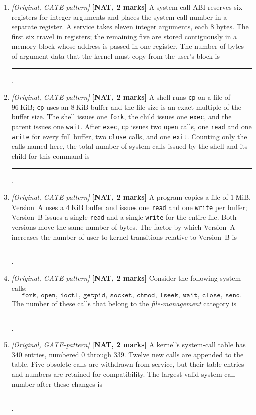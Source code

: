 \documentclass[11pt]{article}
\begin{document}
\begin{enumerate}
\item[\textbf{Q6}] \textit{[Original, GATE-pattern]} \textbf{[NAT, 2 marks]} A system-call ABI reserves six registers for integer arguments and places the system-call number in a separate register. A service takes eleven integer arguments, each 8 bytes. The first six travel in registers; the remaining five are stored contiguously in a memory block whose address is passed in one register. The number of bytes of argument data that the kernel must copy from the user's block is \rule{1.5cm}{0.4pt}.

\item[\textbf{Q7}] \textit{[Original, GATE-pattern]} \textbf{[NAT, 2 marks]} A shell runs \texttt{cp} on a file of $96\ \text{KiB}$; \texttt{cp} uses an $8\ \text{KiB}$ buffer and the file size is an exact multiple of the buffer size. The shell issues one \texttt{fork}, the child issues one \texttt{exec}, and the parent issues one \texttt{wait}. After \texttt{exec}, \texttt{cp} issues two \texttt{open} calls, one \texttt{read} and one \texttt{write} for every full buffer, two \texttt{close} calls, and one \texttt{exit}. Counting only the calls named here, the total number of system calls issued by the shell and its child for this command is \rule{1.5cm}{0.4pt}.

\item[\textbf{Q8}] \textit{[Original, GATE-pattern]} \textbf{[NAT, 2 marks]} A program copies a file of $1\ \text{MiB}$. Version~A uses a $4\ \text{KiB}$ buffer and issues one \texttt{read} and one \texttt{write} per buffer; Version~B issues a single \texttt{read} and a single \texttt{write} for the entire file. Both versions move the same number of bytes. The factor by which Version~A increases the number of user-to-kernel transitions relative to Version~B is \rule{1.5cm}{0.4pt}.

\item[\textbf{Q9}] \textit{[Original, GATE-pattern]} \textbf{[NAT, 2 marks]} Consider the following system calls:
\[
\texttt{fork},\ \texttt{open},\ \texttt{ioctl},\ \texttt{getpid},\ \texttt{socket},\ \texttt{chmod},\ \texttt{lseek},\ \texttt{wait},\ \texttt{close},\ \texttt{send}.
\]
The number of these calls that belong to the \emph{file-management} category is \rule{1.5cm}{0.4pt}.

\item[\textbf{Q10}] \textit{[Original, GATE-pattern]} \textbf{[NAT, 2 marks]} A kernel's system-call table has $340$ entries, numbered $0$ through $339$. Twelve new calls are appended to the table. Five obsolete calls are withdrawn from service, but their table entries and numbers are retained for compatibility. The largest valid system-call number after these changes is \rule{1.5cm}{0.4pt}.

\end{enumerate}
\end{document}
